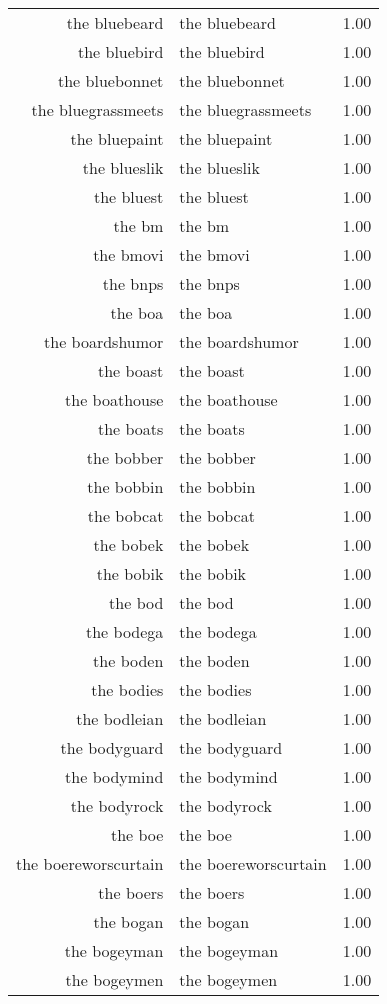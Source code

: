 \begin{table}[ht]
\begin{tabular}{rlr}
  the bluebeard & the bluebeard & 1.00 \\ 
  the bluebird & the bluebird & 1.00 \\ 
  the bluebonnet & the bluebonnet & 1.00 \\ 
  the bluegrassmeets & the bluegrassmeets & 1.00 \\ 
  the bluepaint & the bluepaint & 1.00 \\ 
  the blueslik & the blueslik & 1.00 \\ 
  the bluest & the bluest & 1.00 \\ 
  the bm & the bm & 1.00 \\ 
  the bmovi & the bmovi & 1.00 \\ 
  the bnps & the bnps & 1.00 \\ 
  the boa & the boa & 1.00 \\ 
  the boardshumor & the boardshumor & 1.00 \\ 
  the boast & the boast & 1.00 \\ 
  the boathouse & the boathouse & 1.00 \\ 
  the boats & the boats & 1.00 \\ 
  the bobber & the bobber & 1.00 \\ 
  the bobbin & the bobbin & 1.00 \\ 
  the bobcat & the bobcat & 1.00 \\ 
  the bobek & the bobek & 1.00 \\ 
  the bobik & the bobik & 1.00 \\ 
  the bod & the bod & 1.00 \\ 
  the bodega & the bodega & 1.00 \\ 
  the boden & the boden & 1.00 \\ 
  the bodies & the bodies & 1.00 \\ 
  the bodleian & the bodleian & 1.00 \\ 
  the bodyguard & the bodyguard & 1.00 \\ 
  the bodymind & the bodymind & 1.00 \\ 
  the bodyrock & the bodyrock & 1.00 \\ 
  the boe & the boe & 1.00 \\ 
  the boereworscurtain & the boereworscurtain & 1.00 \\ 
  the boers & the boers & 1.00 \\ 
  the bogan & the bogan & 1.00 \\ 
  the bogeyman & the bogeyman & 1.00 \\ 
  the bogeymen & the bogeymen & 1.00 \\ 

\end{tabular}
\end{table}
